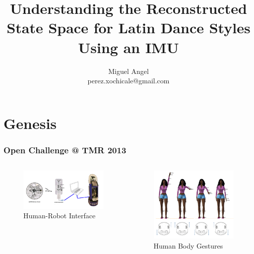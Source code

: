 \documentclass{beamer}
\title{Understanding the Reconstructed State Space 
for Latin Dance Styles Using an IMU}
\author{Miguel Angel \\ 
perez.xochicale@gmail.com}
\institute{INAOE's Robotics Laboratory\\
1st October 2014}
\date{}
\theoremstyle{definition}
\begin{document}
\begin{frame} 
\titlepage
\end{frame}


\section{Genesis} %

\begin{frame}
 \frametitle{Open Challenge @ TMR 2013}

 \begin{columns}[onlytextwidth]
\begin{column}{0.5\textwidth}
 \begin{figure}
\includegraphics[scale=0.15]{hridd-blockdiagram}
\centering 
\caption{Human-Robot Interface}
\end{figure}
\end{column} 
\begin{column}{0.5\textwidth}
\begin{figure}
\includegraphics[scale=0.11]{tmr2013demodance}
\centering 
\caption{Human Body Gestures}
\end{figure}
    \end{column}
\end{columns}


\end{frame}
\end{document}
